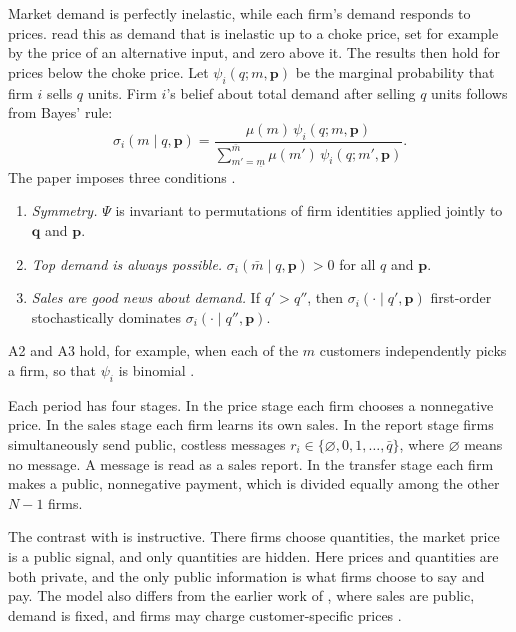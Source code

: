 Market demand is perfectly inelastic, while each firm's demand responds to prices. \citet[footnote
8]{HarringtonSkrzypacz2011} read this as demand that is inelastic up to a choke price, set for example by the price
of an alternative input, and zero above it. The results then hold for prices below the choke price. Let
$\psi_i(q; m, \mathbf{p})$ be the marginal probability that firm $i$ sells $q$ units. Firm $i$'s belief about total
demand after selling $q$ units follows from Bayes' rule:
\begin{equation}\label{eq:12-hs-belief}
  \sigma_i(m \mid q, \mathbf{p}) = \frac{\mu(m)\,\psi_i(q; m, \mathbf{p})}
  {\sum_{m'=\underline m}^{\bar m}\mu(m')\,\psi_i(q; m', \mathbf{p})} .
\end{equation}
The paper imposes three conditions \citep[pp.~2429--2430]{HarringtonSkrzypacz2011}.
\begin{enumerate}[label=A\arabic*.,leftmargin=*]
\item \emph{Symmetry.} $\Psi$ is invariant to permutations of firm identities applied jointly to $\mathbf{q}$ and
$\mathbf{p}$.
\item \emph{Top demand is always possible.} $\sigma_i(\bar m \mid q, \mathbf{p}) > 0$ for all $q$ and $\mathbf{p}$.
\item \emph{Sales are good news about demand.} If $q' > q''$, then $\sigma_i(\cdot \mid q', \mathbf{p})$
first-order stochastically dominates $\sigma_i(\cdot \mid q'', \mathbf{p})$.
\end{enumerate}
A2 and A3 hold, for example, when each of the $m$ customers independently picks a firm, so that $\psi_i$ is
binomial \citep[footnote 9]{HarringtonSkrzypacz2011}.

Each period has four stages. In the price stage each firm chooses a nonnegative price. In the sales stage each firm
learns its own sales. In the report stage firms simultaneously send public, costless messages
$r_i \in \{\varnothing, 0, 1, \dots, \bar q\}$, where $\varnothing$ means no message. A message is read as a sales
report. In the transfer stage each firm makes a public, nonnegative payment, which is divided equally among the
other $N - 1$ firms.

The contrast with \citet{GreenPorter1984} is instructive. There firms choose quantities, the market price is a
public signal, and only quantities are hidden. Here prices and quantities are both private, and the only public
information is what firms choose to say and pay. The model also differs from the earlier work of
\citet{HarringtonSkrzypacz2007}, where sales are public, demand is fixed, and firms may charge customer-specific
prices \citep[pp.~2430--2431]{HarringtonSkrzypacz2011}.

